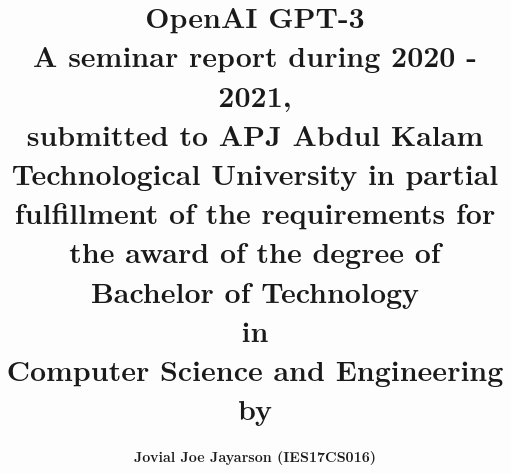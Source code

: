 \usepackage{float}
\usepackage{natbib}
\usepackage{xpatch}
\usepackage{amsmath}
\usepackage{comment}
\usepackage{graphicx}
\usepackage{etoolbox}
\usepackage{geometry}
\usepackage{fancyhdr}
\usepackage{setspace}
\usepackage{amsfonts}
\usepackage{blindtext}
\usepackage{tocbibind} %
\usepackage[T1]{fontenc}
\usepackage[utf8]{inputenc} %
\usepackage[UKenglish]{babel}
\usepackage[section]{placeins}
\usepackage[dvipsnames]{xcolor}
\usepackage[useregional]{datetime2}
\usepackage[pdftex, pdfauthor={Jovial Joe Jayarson}, pdftitle={OpenAI GPT-3}, pdfsubject={Language Model - Seminar Report}]{hyperref}

\newcommand{\mydate}{\DTMdisplaydate{2020}{12}{05}{-1}}

\hypersetup{
    colorlinks      = true,
    urlcolor        = gray,
    linkcolor       = magenta,
    citecolor       = brown,
    citebordercolor = green,
    urlbordercolor  = white,
    linkbordercolor = blue,
}

\graphicspath{{../images/}}
\setlength{\headheight}{32pt}

\title{\textbf{OpenAI GPT-3} \\ \vspace{1cm} \large A seminar report during 2020 - 2021, \\ submitted to APJ Abdul Kalam Technological University in partial fulfillment of the requirements for the award of the degree of \\ \vspace{0.5cm} \large \textbf{Bachelor of Technology \\ in \\ Computer Science and Engineering} \\ \vspace{0.5cm} \large by}
\author{\textbf{Jovial Joe Jayarson (IES17CS016)}}
\date{}

\makeatletter
\patchcmd{\f@nch@head}{\rlap}{\color{gray}\rlap}{}{}
\patchcmd{\f@nch@foot}{\rlap}{\color{gray}\rlap}{}{}




\makeatother

\pagestyle{fancy}
\fancyhf{}
\cfoot{\thepage}
\renewcommand{\headrulewidth}{0pt}
\renewcommand{\footrulewidth}{0pt}
